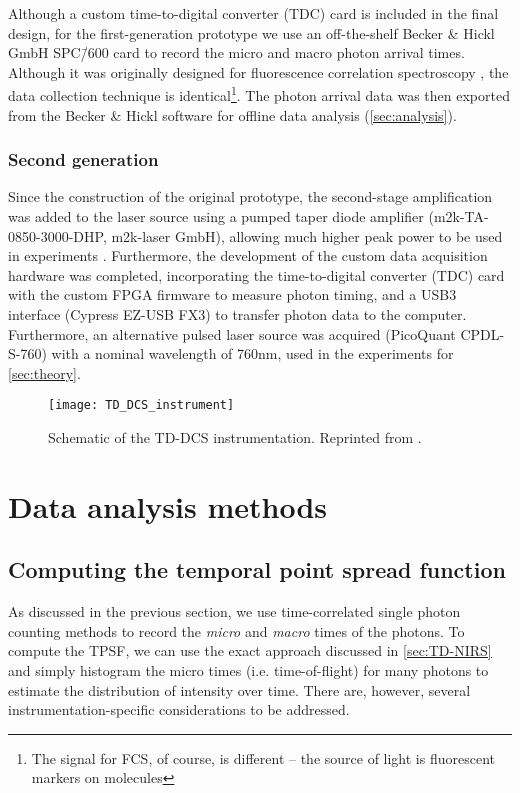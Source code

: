 Although a custom time-to-digital converter (TDC) card is included in the final design, for the first-generation prototype we use an off-the-shelf Becker \& Hickl GmbH SPC\=/600 \cite{Becker2014} card to record the micro and macro photon arrival times. Although it was originally designed for fluorescence correlation spectroscopy \cite{Becker2005, Becker2014}, the data collection technique is identical\footnote{The signal for FCS, of course, is different -- the source of light is fluorescent markers on molecules}. The photon arrival data was then exported from the Becker \& Hickl software for offline data analysis (\autoref{sec:analysis}).


\subsubsection{Second generation}
Since the construction of the original prototype, the second-stage amplification was added to the laser source using a pumped taper diode amplifier (m2k-TA-0850-3000-DHP, m2k-laser GmbH), allowing much higher peak power to be used in experiments \cite{Kangara2014,Poelker1995}. Furthermore, the development of the custom data acquisition hardware was completed, incorporating the time-to-digital converter (TDC) card with the custom FPGA firmware to measure photon timing, and a USB3 interface (Cypress EZ-USB FX3) to transfer photon data to the computer. Furthermore, an alternative pulsed laser source was acquired (PicoQuant CPDL-S-760) with a nominal wavelength of 760nm, used in the experiments for \autoref{sec:theory}.


\begin{figure}[tb]
    \centering
    \texttt{[image: TD\_DCS\_instrument]}
    \caption{Schematic of the TD-DCS instrumentation. Reprinted from \cite{Sutin2016}.}
    \label{fig:TD-DCS_instrument}
\end{figure}


\section{Data analysis methods} \label{sec:analysis}

\subsection{Computing the temporal point spread function}

As discussed in the previous section, we use time-correlated single photon counting methods to record the \emph{micro} and \emph{macro} times of the photons. To compute the TPSF, we can use the exact approach discussed in \autoref{sec:TD-NIRS} and simply histogram the micro times (i.e. time-of-flight) for many photons to estimate the distribution of intensity over time. There are, however, several instrumentation-specific considerations to be addressed.

